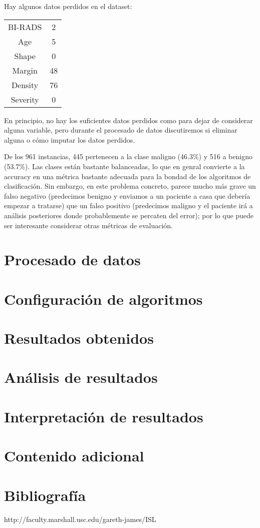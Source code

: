 \documentclass{article}
\begin{document}
Hay algunos datos perdidos en el dataset: \vspace{-5mm}
\begin{table}[H]
  \centering
  \begin{tabular}{c|c}
    BI-RADS     & 2 \\
    Age         & 5 \\
    Shape       & 0 \\
    Margin      & 48 \\
    Density     & 76 \\
    Severity    & 0
  \end{tabular}
\end{table}
\vspace{-8mm} En principio, no hay los suficientes datos perdidos como
para dejar de considerar alguna variable, pero durante el procesado de
datos discutiremos si eliminar alguna o cómo imputar los datos
perdidos.

De los 961 instancias, 445 pertenecen a la clase maligno (46.3\%) y
516 a benigno (53.7\%). Las clases están bastante balanceadas, lo que
en genral convierte a la accuracy en una métrica bastante adecuada
para la bondad de los algoritmos de clasificación. Sin embargo, en este
problema concreto, parece mucho más grave un falso negativo
(predecimos benigno y enviamos a un paciente a casa que debería
empezar a tratarse) que un falso positivo (predecimos maligno y el
paciente irá a análisis posteriores donde probablemente se percaten
del error); por lo que puede ser interesante considerar otras métricas
de evaluación.

\section{Procesado de datos}

\section{Configuración de algoritmos}

\section{Resultados obtenidos}

\section{Análisis de resultados}

\section{Interpretación de resultados}

\section{Contenido adicional}

\section{Bibliografía}

http://faculty.marshall.usc.edu/gareth-james/ISL
\end{document}
